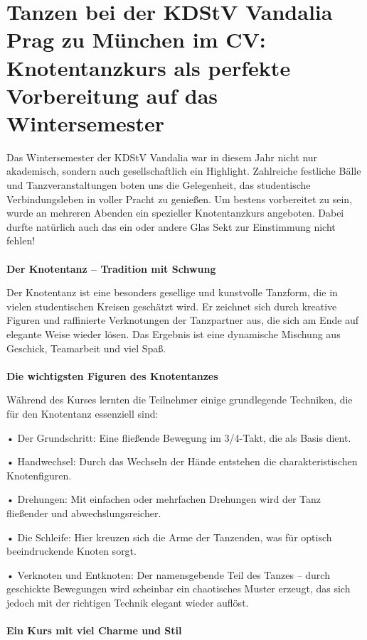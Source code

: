 \section{Tanzen bei der KDStV Vandalia Prag zu
München im CV: Knotentanzkurs als perfekte Vorbereitung auf das Wintersemester}

	
\begin{multicols}{2}

Das Wintersemester der KDStV Vandalia war in diesem Jahr nicht nur akademisch,
sondern auch gesellschaftlich ein Highlight. Zahlreiche festliche Bälle und
Tanzveranstaltungen boten uns die Gelegenheit, das studentische
Verbindungsleben in voller Pracht zu genießen. Um bestens vorbereitet zu sein,
wurde an mehreren Abenden ein spezieller Knotentanzkurs angeboten. Dabei durfte
natürlich auch das ein oder andere Glas Sekt zur Einstimmung nicht fehlen!
\\
\\
\textbf{Der Knotentanz – Tradition mit Schwung}

Der Knotentanz ist eine besonders gesellige und kunstvolle Tanzform, die in
vielen studentischen Kreisen geschätzt wird. Er zeichnet sich durch kreative
Figuren und raffinierte Verknotungen der Tanzpartner aus, die sich am Ende auf
elegante Weise wieder lösen. Das Ergebnis ist eine dynamische Mischung aus
Geschick, Teamarbeit und viel Spaß.
\\
\\
\textbf{Die wichtigsten Figuren des Knotentanzes}

Während des Kurses lernten die Teilnehmer einige grundlegende Techniken, die
für den Knotentanz essenziell sind:

• Der Grundschritt: Eine fließende Bewegung im 3/4-Takt, die als Basis dient.

• Handwechsel: Durch das Wechseln der Hände entstehen die charakteristischen
Knotenfiguren.

• Drehungen: Mit einfachen oder mehrfachen Drehungen wird der Tanz fließender
und abwechslungsreicher.

• Die Schleife: Hier kreuzen sich die Arme der Tanzenden, was für optisch
beeindruckende Knoten sorgt.

• Verknoten und Entknoten: Der namensgebende Teil des Tanzes – durch geschickte
Bewegungen wird scheinbar ein chaotisches Muster erzeugt, das sich jedoch mit
der richtigen Technik elegant wieder auflöst.
\\
\\
\textbf{Ein Kurs mit viel Charme und Stil}


\end{multicols}
